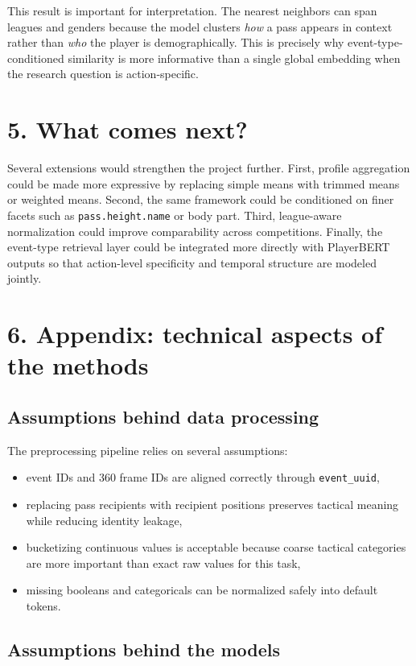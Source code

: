 \documentclass[11pt]{article}
\begin{document}
This result is important for interpretation. The nearest neighbors can span leagues and genders because the model clusters \emph{how} a pass appears in context rather than \emph{who} the player is demographically. This is precisely why event-type-conditioned similarity is more informative than a single global embedding when the research question is action-specific.

\section{5. What comes next?}

Several extensions would strengthen the project further. First, profile aggregation could be made more expressive by replacing simple means with trimmed means or weighted means. Second, the same framework could be conditioned on finer facets such as \texttt{pass.height.name} or body part. Third, league-aware normalization could improve comparability across competitions. Finally, the event-type retrieval layer could be integrated more directly with PlayerBERT outputs so that action-level specificity and temporal structure are modeled jointly.

\appendix
\section{6. Appendix: technical aspects of the methods}

\subsection{Assumptions behind data processing}

The preprocessing pipeline relies on several assumptions:
\begin{itemize}[leftmargin=*]
  \item event IDs and 360 frame IDs are aligned correctly through \texttt{event\_uuid},
  \item replacing pass recipients with recipient positions preserves tactical meaning while reducing identity leakage,
  \item bucketizing continuous values is acceptable because coarse tactical categories are more important than exact raw values for this task,
  \item missing booleans and categoricals can be normalized safely into default tokens.
\end{itemize}

\subsection{Assumptions behind the models}
\end{document}
